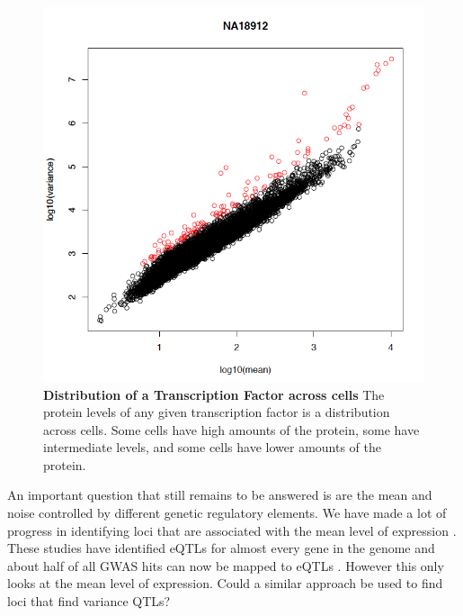 \begin{figure}[t!]  
    \centering
    \includegraphics[width=\linewidth, scale=0.25]{figures/intro/intro_outlier1.png}
    \caption[Distribution of a Transcription Factor across cells.]{%
        \textbf{Distribution of a Transcription Factor across cells}
        The protein levels of any given transcription factor is a distribution across cells. Some cells have high amounts of the protein, some have intermediate levels, and some cells have lower amounts of the protein.
    }
    \label{fig:intro1}
\end{figure}

An important question that still remains to be answered is are the mean and noise controlled by different genetic regulatory elements.
We have made a lot of progress in identifying loci that are associated with the mean level of expression \cite{gtex_consortium_genetic_2017} \cite{vosa2021ng} \cite{wen2017pg}. These studies have identified eQTLs for almost every gene in the genome and about half of all GWAS hits can now be mapped to eQTLs \cite{gtex_consortium_genetic_2017}. However this only looks at the mean level of expression. Could a similar approach be used to find loci that find variance QTLs?

